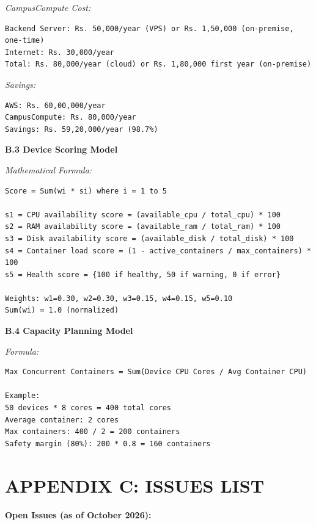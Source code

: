 \documentclass[12pt,a4paper]{article}
\begin{document}
\textit{CampusCompute Cost:}
\begin{verbatim}
Backend Server: Rs. 50,000/year (VPS) or Rs. 1,50,000 (on-premise, one-time)
Internet: Rs. 30,000/year
Total: Rs. 80,000/year (cloud) or Rs. 1,80,000 first year (on-premise)
\end{verbatim}

\textit{Savings:}
\begin{verbatim}
AWS: Rs. 60,00,000/year
CampusCompute: Rs. 80,000/year
Savings: Rs. 59,20,000/year (98.7%)
\end{verbatim}

\textbf{B.3 Device Scoring Model}

\textit{Mathematical Formula:}
\begin{verbatim}
Score = Sum(wi * si) where i = 1 to 5

s1 = CPU availability score = (available_cpu / total_cpu) * 100
s2 = RAM availability score = (available_ram / total_ram) * 100
s3 = Disk availability score = (available_disk / total_disk) * 100
s4 = Container load score = (1 - active_containers / max_containers) * 100
s5 = Health score = {100 if healthy, 50 if warning, 0 if error}

Weights: w1=0.30, w2=0.30, w3=0.15, w4=0.15, w5=0.10
Sum(wi) = 1.0 (normalized)
\end{verbatim}

\textbf{B.4 Capacity Planning Model}

\textit{Formula:}
\begin{verbatim}
Max Concurrent Containers = Sum(Device CPU Cores / Avg Container CPU)

Example:
50 devices * 8 cores = 400 total cores
Average container: 2 cores
Max containers: 400 / 2 = 200 containers
Safety margin (80%): 200 * 0.8 = 160 containers
\end{verbatim}

\section*{APPENDIX C: ISSUES LIST}

\textbf{Open Issues (as of October 2026):}
\end{document}
